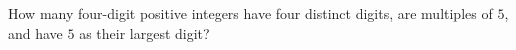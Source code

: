 How many four-digit positive integers have four distinct digits, are multiples of $5$, and have $5$ as their largest digit?
